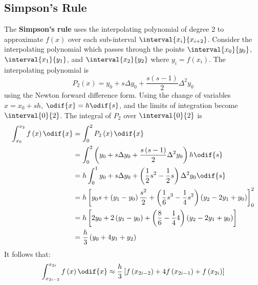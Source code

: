 \documentclass{article}
\begin{document}
\subsection{Simpson's Rule}
The \textbf{Simpson's rule} uses the interpolating polynomial of degree
2 to approximate \(f\left( x \right)\) over each sub-interval
\(\interval{x_i}{x_{i + 2}}\). Consider the interpolating polynomial
which passes through the points \(\interval{x_0}{y_0}\),
\(\interval{x_1}{y_1}\), and \(\interval{x_2}{y_2}\) where \(y_i =
f\left( x_i \right)\). The interpolating polynomial is
\begin{equation*}
    P_2\left( x \right) = y_0 + s \Delta{y_0} + \frac{s\left( s - 1 \right)}{2} \Delta^2{y_0}
\end{equation*}
using the Newton forward difference form. Using the change of variables
\(x = x_0 + s h\), \(\odif{x} = h \odif{s}\), and the limits of
integration become \(\interval{0}{2}\). The integral of \(P_2\) over
\(\interval{0}{2}\) is
\begin{align*}
    \int_{x_0}^{x_2} f\left( x \right) \odif{x} & = \int_0^2 P_2\left( x \right) \odif{x}                                                                                                                  \\
                                                & = \int_0^2 \left( y_0 + s \Delta{y_0} + \frac{s\left( s - 1 \right)}{2} \Delta^2{y_0} \right) h \odif{s}                                                 \\
                                                & = h \int_0^1 y_0 + s \Delta{y_0} + \left( \frac{1}{2} s^2 - \frac{1}{2} s \right) \Delta^2{y_0} \odif{s}                                                 \\
                                                & = h \left[ y_0 s + \left( y_1 - y_0 \right) \frac{s^2}{2} + \left( \frac{1}{6} s^3 - \frac{1}{4} s^2 \right) \left( y_2 - 2y_1 + y_0 \right) \right]_0^2 \\
                                                & = h \left[ 2 y_0 + 2 \left( y_1 - y_0 \right) + \left( \frac{8}{6} - \frac{1}{4} 4 \right) \left( y_2 - 2y_1 + y_0 \right) \right]                       \\
                                                & = \frac{h}{3} \left( y_0 + 4 y_1 + y_2 \right)
\end{align*}
It follows that:
\begin{equation*}
    \int_{x_{2i - 2}}^{x_{2i}} f\left( x \right) \odif{x} \approx \frac{h}{3} \left[ f\left( x_{2i - 2} \right) + 4f\left( x_{2i - 1} \right) + f\left( x_{2i} \right) \right]
\end{equation*}
\end{document}
